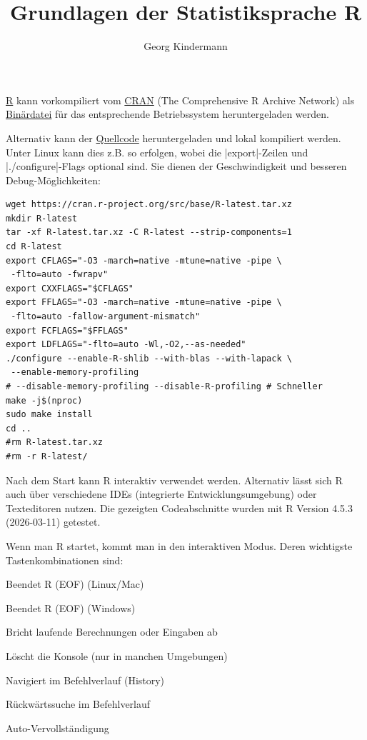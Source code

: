 \documentclass[10pt,twocolumn]{scrartcl}
\title{Grundlagen der Statistiksprache R}
\author{Georg Kindermann}
\renewcommand{\lstinline}{\mycoloredinline}
\begin{document}
\maketitle


\tableofcontents
\smallskip
\noindent
\href{https://www.r-project.org/}{R} kann vorkompiliert vom
\href{https://cran.r-project.org/}{CRAN} (The Comprehensive R Archive
Network) als \href{https://cran.r-project.org/bin/}{Binärdatei} für
das entsprechende Betriebssystem heruntergeladen werden.

Alternativ kann der
\href{https://cran.r-project.org/src/base/R-4/}{Quellcode}
heruntergeladen und lokal kompiliert werden. Unter Linux kann dies
z.B. so erfolgen, wobei die \lstinline|export|-Zeilen und
\lstinline|./configure|-Flags optional sind. Sie dienen der
Geschwindigkeit und besseren Debug-Möglichkeiten:

\begin{lstlisting}
wget https://cran.r-project.org/src/base/R-latest.tar.xz
mkdir R-latest
tar -xf R-latest.tar.xz -C R-latest --strip-components=1
cd R-latest
export CFLAGS="-O3 -march=native -mtune=native -pipe \
 -flto=auto -fwrapv"
export CXXFLAGS="$CFLAGS"
export FFLAGS="-O3 -march=native -mtune=native -pipe \
 -flto=auto -fallow-argument-mismatch"
export FCFLAGS="$FFLAGS"
export LDFLAGS="-flto=auto -Wl,-O2,--as-needed"
./configure --enable-R-shlib --with-blas --with-lapack \
 --enable-memory-profiling
# --disable-memory-profiling --disable-R-profiling # Schneller
make -j$(nproc)
sudo make install
cd ..
#rm R-latest.tar.xz
#rm -r R-latest/
\end{lstlisting}

Nach dem Start kann R interaktiv verwendet werden. Alternativ lässt
sich R auch über verschiedene IDEs (integrierte Entwicklungsumgebung)
oder Texteditoren nutzen. Die gezeigten Codeabschnitte wurden mit R
Version 4.5.3 (2026-03-11) getestet.

Wenn man R startet, kommt man in den interaktiven Modus.
Deren wichtigste Tastenkombinationen sind:
\begin{description}[style=multiline,leftmargin=2cm,nolistsep]
  \item[CTRL+d] Beendet R (EOF) (Linux/Mac)
  \item[CTRL+z] Beendet R (EOF) (Windows)
  \item[CTRL+c] Bricht laufende Berechnungen oder Eingaben ab
  \item[CTRL+l] Löscht die Konsole (nur in manchen Umgebungen)
  \item[Pfeil ↑ / ↓] Navigiert im Befehlverlauf (History)
  \item[CTRL+r] Rückwärtssuche im Befehlverlauf
  \item[Tab] Auto-Vervollständigung
\end{description}
\end{document}
